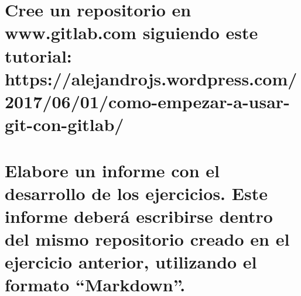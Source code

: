 \documentclass[11pt,a4paper]{article}
\begin{document}
\section{Cree un repositorio en www.gitlab.com siguiendo este tutorial:
\small https://alejandrojs.wordpress.com/2017/06/01/como-empezar-a-usar-git-con-gitlab/}

\section{Elabore un informe con el desarrollo de los ejercicios. Este informe deberá
escribirse dentro del mismo repositorio creado en el ejercicio anterior, utilizando el
formato “Markdown”.}
\end{document}
